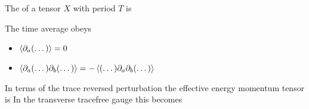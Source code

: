 \documentclass{article}
\begin{document}
\begin{definition}
The  of a tensor $X$ with period $T$ is 
\end{definition}

\begin{lemma}
The time average obeys 
\begin{itemize}
    \item $\braket{\partial_a (\dots)} = 0 $
    \item $\braket{\partial_a(\dots)\partial_b(\dots)} = -\braket{(\dots)\partial_a\partial_b (\dots)}$
\end{itemize}
\end{lemma}

\begin{lemma}
In terms of the trace reversed perturbation the effective energy momentum tensor is 
In the transverse tracefree gauge this becomes 
\end{lemma}
\end{document}
